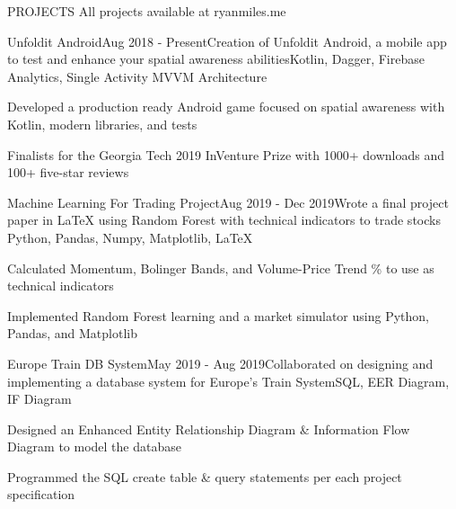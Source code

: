 \documentclass{resume} %
\begin{document}
\vspace{.3em}


\begin{rSectionProjects}{PROJECTS} {All projects available at ryanmiles.me}
	
	\begin{rSubsectionProjects}{Unfoldit Android}{Aug 2018 - Present}{Creation of Unfoldit Android, a mobile app to test and enhance your spatial awareness abilities}{Kotlin, Dagger, Firebase Analytics, Single Activity MVVM Architecture}
		\item Developed a production ready Android game focused on spatial awareness with Kotlin, modern libraries, and tests
		\item Finalists for the Georgia Tech 2019 InVenture Prize with 1000+ downloads and 100+ five-star reviews
		
	\end{rSubsectionProjects} 


\begin{rSubsectionProjects}{Machine Learning For Trading Project}{Aug 2019 - Dec 2019}{Wrote a final project paper in LaTeX using Random Forest with technical indicators to trade stocks }{Python, Pandas, Numpy, Matplotlib, LaTeX} {}
	\item Calculated Momentum, Bolinger Bands, and Volume-Price Trend \% to use as technical indicators
	\item Implemented Random Forest learning and a market simulator using Python, Pandas, and Matplotlib
\end{rSubsectionProjects} 


\begin{rSubsectionProjects}{Europe Train DB System}{May 2019 - Aug 2019}{Collaborated on designing and implementing a database system for Europe's Train System}{SQL, EER Diagram, IF Diagram} {}
	\item Designed an Enhanced Entity Relationship Diagram \& Information Flow Diagram to model the database
	\item Programmed the SQL create table  \& query statements per each project specification
	

\end{rSubsectionProjects}
\end{rSectionProjects}
\end{document}

